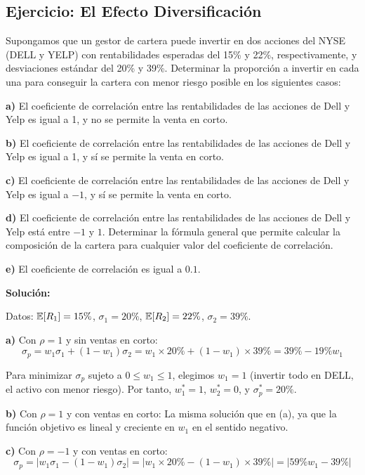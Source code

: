 \subsection{Ejercicio: El Efecto Diversificación}

\begin{ejemplo}
Supongamos que un gestor de cartera puede invertir en dos acciones del NYSE (DELL y YELP) con rentabilidades esperadas del 15\% y 22\%, respectivamente, y desviaciones estándar del 20\% y 39\%. Determinar la proporción a invertir en cada una para conseguir la cartera con menor riesgo posible en los siguientes casos:

\textbf{a)} El coeficiente de correlación entre las rentabilidades de las acciones de Dell y Yelp es igual a 1, y no se permite la venta en corto.

\textbf{b)} El coeficiente de correlación entre las rentabilidades de las acciones de Dell y Yelp es igual a 1, y sí se permite la venta en corto.

\textbf{c)} El coeficiente de correlación entre las rentabilidades de las acciones de Dell y Yelp es igual a $-1$, y sí se permite la venta en corto.

\textbf{d)} El coeficiente de correlación entre las rentabilidades de las acciones de Dell y Yelp está entre $-1$ y $1$. Determinar la fórmula general que permite calcular la composición de la cartera para cualquier valor del coeficiente de correlación.

\textbf{e)} El coeficiente de correlación es igual a $0.1$.

\textbf{Solución:}

Datos: $\mathbb{E}[R_1] = 15\%$, $\sigma_1 = 20\%$, $\mathbb{E}[R_2] = 22\%$, $\sigma_2 = 39\%$.

\textbf{a)} Con $\rho = 1$ y sin ventas en corto:
$$\sigma_p = w_1 \sigma_1 + (1-w_1) \sigma_2 = w_1 \times 20\% + (1-w_1) \times 39\% = 39\% - 19\% w_1$$

Para minimizar $\sigma_p$ sujeto a $0 \leq w_1 \leq 1$, elegimos $w_1 = 1$ (invertir todo en DELL, el activo con menor riesgo). Por tanto, $w_1^* = 1$, $w_2^* = 0$, y $\sigma_p^* = 20\%$.

\textbf{b)} Con $\rho = 1$ y con ventas en corto:
La misma solución que en (a), ya que la función objetivo es lineal y creciente en $w_1$ en el sentido negativo.

\textbf{c)} Con $\rho = -1$ y con ventas en corto:
$$\sigma_p = |w_1 \sigma_1 - (1-w_1) \sigma_2| = |w_1 \times 20\% - (1-w_1) \times 39\%| = |59\% w_1 - 39\%|$$


\end{ejemplo}
